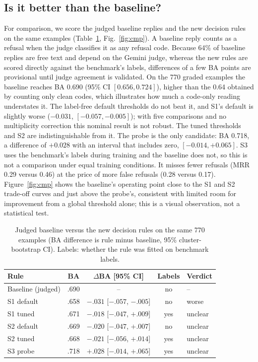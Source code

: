 \documentclass[conference]{IEEEtran}
\begin{document}
\subsection{Is it better than the baseline?}
For comparison, we score the judged baseline replies and the new decision rules on the same examples (Table~\ref{tab:cmp}, Fig.~\ref{fig:cmp}). A baseline reply counts as a refusal when the judge classifies it as any refusal code. Because 64\% of baseline replies are free text and depend on the Gemini judge, whereas the new rules are scored directly against the benchmark's labels, differences of a few BA points are provisional until judge agreement is validated. On the 770 graded examples the baseline reaches BA 0.690 (95\% CI $[0.656,0.724]$), higher than the 0.64 obtained by counting only clean codes, which illustrates how much a code-only reading understates it. The label-free default thresholds do not beat it, and S1's default is slightly worse ($-0.031$, $[-0.057,-0.005]$); with five comparisons and no multiplicity correction this nominal result is not robust. The tuned thresholds and S2 are indistinguishable from it. The probe is the only candidate: BA 0.718, a difference of $+0.028$ with an interval that includes zero, $[-0.014,+0.065]$. S3 uses the benchmark's labels during training and the baseline does not, so this is not a comparison under equal training conditions. It misses fewer refusals (MRR 0.29 versus 0.46) at the price of more false refusals (0.28 versus 0.17). Figure~\ref{fig:cmp} shows the baseline's operating point close to the S1 and S2 trade-off curves and just above the probe's, consistent with limited room for improvement from a global threshold alone; this is a visual observation, not a statistical test.

\begin{table}[t]
\centering
\caption{Judged baseline versus the new decision rules on the same 770 examples (BA difference is rule minus baseline, 95\% cluster-bootstrap CI). Labels: whether the rule was fitted on benchmark labels.}
\label{tab:cmp}
\footnotesize
\setlength{\tabcolsep}{2.5pt}
\begin{tabular}{lcccl}
\toprule
Rule & BA & $\Delta$BA [95\% CI] & Labels & Verdict \\
\midrule
Baseline (judged) & .690 & -- & no & -- \\
S1 default & .658 & $-.031$ [$-.057$, $-.005$] & no & worse \\
S1 tuned & .671 & $-.018$ [$-.047$, $+.009$] & yes & unclear \\
S2 default & .669 & $-.020$ [$-.047$, $+.007$] & no & unclear \\
S2 tuned & .668 & $-.021$ [$-.056$, $+.014$] & yes & unclear \\
S3 probe & .718 & $+.028$ [$-.014$, $+.065$] & yes & unclear \\
\bottomrule
\end{tabular}
\end{table}
\end{document}
